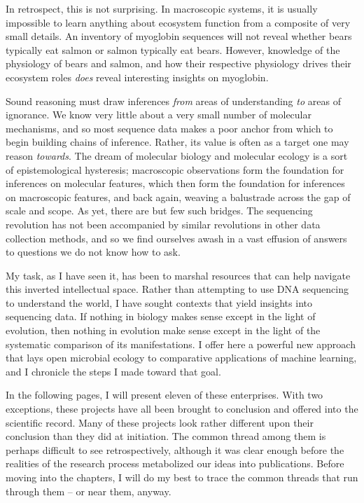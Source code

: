In retrospect, this is not surprising. In macroscopic systems, it is usually impossible to learn anything about ecosystem function from a composite of very small details. An inventory of myoglobin sequences will not reveal whether bears typically eat salmon or salmon typically eat bears. However, knowledge of the physiology of bears and salmon, and how their respective physiology drives their ecosystem roles {\em does} reveal interesting insights on myoglobin.

Sound reasoning must draw inferences {\em from} areas of understanding {\em to} areas of ignorance. We know very little about a very small number of molecular mechanisms, and so most sequence data makes a poor anchor from which to begin building chains of inference. Rather, its value is often as a target one may reason {\em towards}. The dream of molecular biology and molecular ecology is a sort of epistemological hysteresis; macroscopic observations form the foundation for inferences on molecular features, which then form the foundation for inferences on macroscopic features, and back again, weaving a balustrade across the gap of scale and scope. As yet, there are but few such bridges. The sequencing revolution has not been accompanied by similar revolutions in other data collection methods, and so we find ourselves awash in a vast effusion of answers to questions we do not know how to ask.

My task, as I have seen it, has been to marshal resources that can help navigate this inverted intellectual space. Rather than attempting to use DNA sequencing to understand the world, I have sought contexts that yield insights into sequencing data. If nothing in biology makes sense except in the light of evolution, then nothing in evolution make sense except in the light of the systematic comparison of its manifestations. I offer here a powerful new approach that lays open microbial ecology to comparative applications of machine learning, and I chronicle the steps I made toward that goal.

In the following pages, I will present eleven of these enterprises. With two exceptions, these projects have all been brought to conclusion and offered into the scientific record. Many of these projects look rather different upon their conclusion than they did at initiation. The common thread among them is perhaps difficult to see retrospectively, although it was clear enough before the realities of the research process metabolized our ideas into publications. Before moving into the chapters, I will do my best to trace the common threads that run through them -- or near them, anyway.

